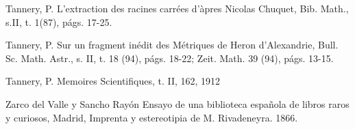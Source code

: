 \documentclass{amsart}
\begin{document}
\begin{thebibliography}{99}
  Tannery, P. L'extraction des racines carr\'ees d'\`apres Nicolas Chuquet, Bib. Math., s.II, t. 1(87), p\'ags. 17-25.

  Tannery, P. Sur un fragment in\'edit des M\'etriques de Heron d'Alexandrie, Bull. Sc. Math. Astr., s. II, t. 18 (94), p\'ags. 18-22; Zeit. Math. 39 (94), p\'ags. 13-15.

  Tannery, P.   Memoires Scientifiques, t. II, 162, 1912

 Zarco del Valle y Sancho Ray\'on Ensayo de una biblioteca espa\~nola de libros raros y curiosos, Madrid, Imprenta y estereotipia de M. Rivadeneyra. 1866.

\end{thebibliography}
\end{document}
